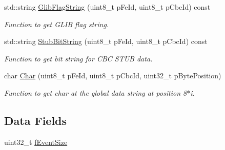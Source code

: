 \begin{DoxyCompactItemize}
std\-::string \hyperlink{class_ph2___hw_interface_1_1_event_a8b6a50a409927366a830084f11885882}{Glib\-Flag\-String} (uint8\-\_\-t p\-Fe\-Id, uint8\-\_\-t p\-Cbc\-Id) const 
\begin{DoxyCompactList}\small\item\em Function to get G\-L\-I\-B flag string. \end{DoxyCompactList}\item 
std\-::string \hyperlink{class_ph2___hw_interface_1_1_event_abc647a9563bd796f8785590a2b5b525b}{Stub\-Bit\-String} (uint8\-\_\-t p\-Fe\-Id, uint8\-\_\-t p\-Cbc\-Id) const 
\begin{DoxyCompactList}\small\item\em Function to get bit string for C\-B\-C S\-T\-U\-B data. \end{DoxyCompactList}\item 
char \hyperlink{class_ph2___hw_interface_1_1_event_a348abea85bdfdfc8c0b88cda907dbea8}{Char} (uint8\-\_\-t p\-Fe\-Id, uint8\-\_\-t p\-Cbc\-Id, uint32\-\_\-t p\-Byte\-Position)
\begin{DoxyCompactList}\small\item\em Function to get char at the global data string at position 8$\ast$i. \end{DoxyCompactList}\end{DoxyCompactItemize}
\subsection*{Data Fields}
\begin{DoxyCompactItemize}
\item 
uint32\-\_\-t \hyperlink{class_ph2___hw_interface_1_1_event_a0a12db10e67652851517cc65c8057667}{f\-Event\-Size}
\end{DoxyCompactItemize}
